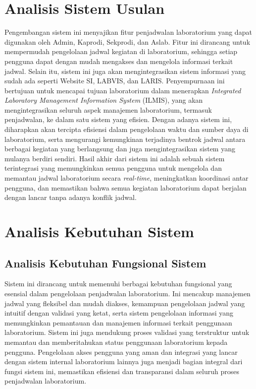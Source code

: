 \section{Analisis Sistem Usulan}
Pengembangan sistem ini menyajikan fitur penjadwalan laboratorium yang dapat digunakan oleh Admin, Kaprodi, Sekprodi, dan Aslab. Fitur ini dirancang untuk mempermudah pengelolaan jadwal kegiatan di laboratorium, sehingga setiap pengguna dapat dengan mudah mengakses dan mengelola informasi terkait jadwal. Selain itu, sistem ini juga akan mengintegrasikan sistem informasi yang sudah ada seperti Website SI, LABVIS, dan LARIS. Penyempurnaan ini bertujuan untuk mencapai tujuan laboratorium dalam menerapkan \textit{Integrated Laboratory Management Information System} (ILMIS), yang akan mengintegrasikan seluruh aspek manajemen laboratorium, termasuk penjadwalan, ke dalam satu sistem yang efisien. Dengan adanya sistem ini, diharapkan akan tercipta efisiensi dalam pengelolaan waktu dan sumber daya di laboratorium, serta mengurangi kemungkinan terjadinya bentrok jadwal antara berbagai kegiatan yang berlangsung dan juga mengintegrasikan sistem yang mulanya berdiri sendiri. Hasil akhir dari sistem ini adalah sebuah sistem terintegrasi yang memungkinkan semua pengguna untuk mengelola dan memantau jadwal laboratorium secara \textit{real-time}, meningkatkan koordinasi antar pengguna, dan memastikan bahwa semua kegiatan laboratorium dapat berjalan dengan lancar tanpa adanya konflik jadwal.

\section{Analisis Kebutuhan Sistem}
\subsection{Analisis Kebutuhan Fungsional Sistem}
Sistem ini dirancang untuk memenuhi berbagai kebutuhan fungsional yang esensial dalam pengelolaan penjadwalan laboratorium. Ini mencakup manajemen jadwal yang fleksibel dan mudah diakses, kemampuan pengelolaan jadwal yang intuitif dengan validasi yang ketat, serta sistem pengelolaan informasi yang memungkinkan pemantauan dan manajemen informasi terkait penggunaan laboratorium. Sistem ini juga mendukung proses validasi yang terstruktur  untuk memantau dan memberitahukan status penggunaan laboratorium kepada pengguna. Pengelolaan akses pengguna yang aman dan integrasi yang lancar dengan sistem internal laboratorium lainnya juga menjadi bagian integral dari fungsi sistem ini, memastikan efisiensi dan transparansi dalam seluruh proses penjadwalan laboratorium.

